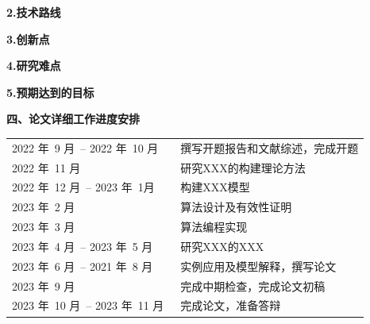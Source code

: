 \documentclass[11pt, a4paper]{article}
\begin{document}
\vskip 0.1cm
\noindent
{\bfseries
  2.技术路线
}

\vskip 0.1cm
\noindent
{\bfseries
  3.创新点
}

\vskip 0.1cm
\noindent
{\bfseries
  4.研究难点
}

\vskip 0.1cm
\noindent
{\bfseries
  5.预期达到的目标
}


\newpage

\noindent
{\fontsize{12pt}{\baselineskip}\selectfont \bfseries
  四、论文详细工作进度安排
}
\newline


\begin{table}[!h]
  \setlength\tabcolsep{5pt}
  \begin{center}
    \begin{tabular}{p{5.5cm} p{9.5cm}}
    2022 年\ 9 月\ -- 2022 年\ 10 月\ & 撰写开题报告和文献综述，完成开题\\
    2022 年\ 11 月\ & 研究XXX的构建理论方法 \\
    2022 年\ 12 月\ -- 2023 年\ 1月\ & 构建XXX模型 \\
    2023 年\ 2 月\ & 算法设计及有效性证明 \\
    2023 年\ 3 月\ & 算法编程实现 \\
    2023 年\ 4 月\ -- 2023 年\ 5 月\ & 研究XXX的XXX \\
    2023 年\ 6 月\ -- 2021 年\ 8 月\ & 实例应用及模型解释，撰写论文 \\
    2023 年\ 9 月\ & 完成中期检查，完成论文初稿\\
    2023 年\ 10 月\ -- 2023 年\ 11 月\ & 完成论文，准备答辩 \\
    \end{tabular}
  \end{center}
\end{table}
\vspace*{-0.6cm}

\newpage


\end{document}
